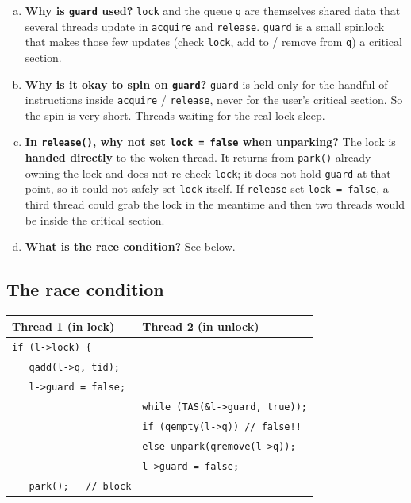 \documentclass[11pt,a4paper]{article}
\begin{document}
\begin{solbox}
\begin{enumerate}[(a)]
  \item \textbf{Why is \texttt{guard} used?} \texttt{lock} and the queue
        \texttt{q} are themselves shared data that several threads update in
        \texttt{acquire} and \texttt{release}. \texttt{guard} is a small
        spinlock that makes those few updates (check \texttt{lock}, add to /
        remove from \texttt{q}) a critical section.
  \item \textbf{Why is it okay to spin on \texttt{guard}?} \texttt{guard} is
        held only for the handful of instructions inside \texttt{acquire} /
        \texttt{release}, never for the user's critical section. So the
        spin is very short. Threads waiting for the real lock sleep.
  \item \textbf{In \texttt{release()}, why not set \texttt{lock = false}
        when unparking?} The lock is \textbf{handed directly} to the woken
        thread. It returns from \texttt{park()} already owning the lock and
        does not re-check \texttt{lock}; it does not hold \texttt{guard} at
        that point, so it could not safely set \texttt{lock} itself. If
        \texttt{release} set \texttt{lock = false}, a third thread could grab
        the lock in the meantime and then two threads would be inside the
        critical section.
  \item \textbf{What is the race condition?} See below.
\end{enumerate}
\end{solbox}

\subsection{The race condition}

\begin{center}
\renewcommand{\arraystretch}{1.12}
\begin{tabular}{@{}ll@{}}
  \toprule
  \textbf{Thread 1} (in lock) & \textbf{Thread 2} (in unlock) \\
  \midrule
  \texttt{if (l->lock) \{} & \\
  \texttt{\ \ \ qadd(l->q, tid);} & \\
  \texttt{\ \ \ l->guard = false;} & \\
  & \texttt{while (TAS(\&l->guard, true));} \\
  & \texttt{if (qempty(l->q)) // false!!} \\
  & \texttt{else unpark(qremove(l->q));} \\
  & \texttt{l->guard = false;} \\
  \texttt{\ \ \ park(); \ \ // block} & \\
  \bottomrule
\end{tabular}
\end{center}
\end{document}
